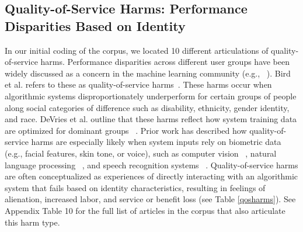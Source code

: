 \subsection{Quality-of-Service Harms: Performance Disparities Based on Identity}
In our initial coding of the corpus, we located 10 different articulations of quality-of-service harms. Performance disparities across different user groups have been widely discussed as a concern in the machine learning community (e.g., ~\cite{Liao_2015, Tatman_2017}). Bird et al. refers to these as quality-of-service harms~\cite{Bird_2020}. These harms occur when algorithmic systems disproportionately underperform for certain groups of people along social categories of difference such as disability, ethnicity, gender identity, and race. DeVries et al. outline that these harms reflect how system training data are optimized for dominant groups ~\cite{DeVries_2019}. Prior work has described how quality-of-service harms are especially likely when system inputs rely on biometric data (e.g., facial features, skin tone, or voice), such as computer vision ~\cite{Buolamwini_Friedler_Wilson, Raji_Gebru_Mitchell_Buolamwini_Lee_Denton_2020}, natural language processing ~\cite{Hutchinson_Prabhakaran_Denton_2020, Liang_Li_Zheng_Lim_Salakhutdinov_Morency_2020, Pruksachatkun_Krishna_Dhamala_Gupta_Chang_2021}, and speech recognition systems ~\cite{koenecke2020racial, mengesha2021don}. Quality-of-service harms are often conceptualized as experiences of directly interacting with an algorithmic system that fails based on identity characteristics, resulting in feelings of alienation, increased labor, and service or benefit loss (see Table \ref{qosharms}). See Appendix Table 10 for the full list of articles in the corpus that also articulate this harm type.

